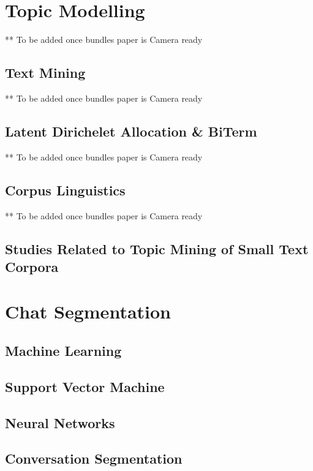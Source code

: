 \section{Topic Modelling}

** To be added once bundles paper is Camera ready

\subsection{Text Mining}

** To be added once bundles paper is Camera ready

\subsection{Latent Dirichelet Allocation \& BiTerm}

** To be added once bundles paper is Camera ready

\subsection{Corpus Linguistics}

** To be added once bundles paper is Camera ready

\subsection{Studies Related to Topic Mining of Small Text Corpora}



\section{Chat Segmentation}

\subsection{Machine Learning}

\subsection{Support Vector Machine}

\subsection{Neural Networks}

\subsection{Conversation Segmentation}

